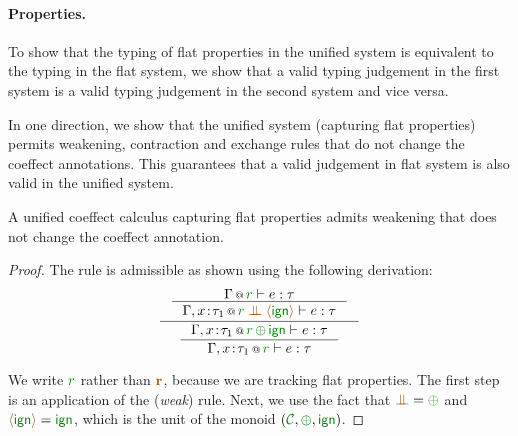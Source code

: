 \paragraph{Properties.}
To show that the typing of flat properties in the unified system is equivalent to the typing in the
flat system, we show that a valid typing judgement in the first system is a valid typing judgement in
the second system and vice versa.

In one direction, we show that the unified system (capturing flat properties) permits weakening,
contraction and exchange rules that do not change the coeffect annotations. This guarantees that
a valid judgement in flat system is also valid in the unified system.

\begin{lemma}
\label{thm:further-weak}
A unified coeffect calculus capturing flat properties admits weakening that does not change the
coeffect annotation.
\end{lemma}
\begin{proof}
The rule is admissible as shown using the following derivation:
\begin{equation*}
\inference
  { \inference
      {\coctx{\Gamma}{ \cclrd{r} } \vdash e : \tau}
      {\coctx{\Gamma,x \!:\! \tau_1}{\cclrd{r} \;\apar\; \alift{ \czero }} \vdash e : \tau} }
  { \inference
      {\coctx{\Gamma,x \!:\! \tau_1}{\cclrd{r} \,\cpar\, \czero} \vdash e : \tau}
      {\coctx{\Gamma,x \!:\! \tau_1}{\cclrd{r}} \vdash e : \tau} }
\end{equation*}

\noindent
We write $\cclrd{r}$ rather than $\aclrd{\textbf{r}}$, because we are tracking flat properties.
The first step is an application of the (\emph{weak}) rule. Next, we use the fact that
$\apar=\cpar$ and $\alift{\czero}=\czero$, which is the unit of the monoid $(\C, \cpar, \czero)$.
\end{proof}

